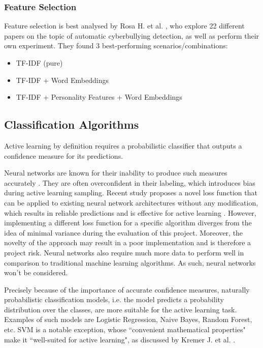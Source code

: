 \documentclass[a4paper,12pt]{article}
\begin{document}
\subsubsection{Feature Selection}
Feature selection is best analysed by Rosa H. et al. \cite{Rosa2019}, who explore 22 different papers on the topic of automatic cyberbullying detection, as well as perform their own experiment. They found 3 best-performing scenarios/combinations:
\begin{itemize}
    \item TF-IDF (pure)
    \item TF-IDF + Word Embeddings
    \item TF-IDF + Personality Features + Word Embeddings
\end{itemize}
\subsection{Classification Algorithms}
Active learning by definition requires a probabilistic classifier that outputs a confidence measure for its predictions.

Neural networks are known for their inability to produce such measures accurately \cite{Nguyen2015}. They are often overconfident in their labeling, which introduces bias during active learning sampling.
Recent study proposes a novel loss function that can be applied to existing neural network architectures without any modification, which results in reliable predictions and is effective for active learning \cite{Moon2020}. However, implementing a different loss function for a specific algorithm diverges from the idea of minimal variance during the evaluation of this project. Moreover, the novelty of the approach may result in a poor implementation and is therefore a project risk. Neural networks also require much more data to perform well in comparison to traditional machine learning algorithms. As such, neural networks won't be considered.

Precisely because of the importance of accurate confidence measures, naturally probabilistic classification models, i.e. the model predicts a probability distribution over the classes, are more suitable for the active learning task. Examples of such models are Logistic Regression, Naive Bayes, Random Forest, etc. SVM is a notable exception, whose ``convenient mathematical properties" make it ``well-suited for active learning", as discussed by Kremer J. et al. \cite{Kremer2014}.
\end{document}
